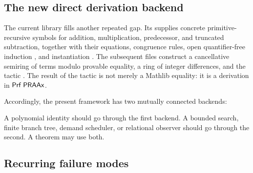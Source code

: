 \subsection{The new direct derivation backend}

The current  library fills another repeated gap.  Its
 supplies concrete primitive-recursive symbols for
addition, multiplication, predecessor, and truncated subtraction, together
with their equations, congruence rules, open quantifier-free induction
, and instantiation .  The subsequent files construct a
cancellative semiring of terms modulo provable equality, a ring of integer
differences, and the tactic .  The result of the tactic is not
merely a Mathlib equality: it is a derivation in \(\mathsf{Prf}\;\mathsf{PRAAx}\).

Accordingly, the present framework has two mutually connected backends:

\begin{center}
\end{center}

A polynomial identity should go through the first backend.  A bounded search,
finite branch tree, demand scheduler, or relational observer should go through
the second.  A theorem may use both.

\subsection{Recurring failure modes}

